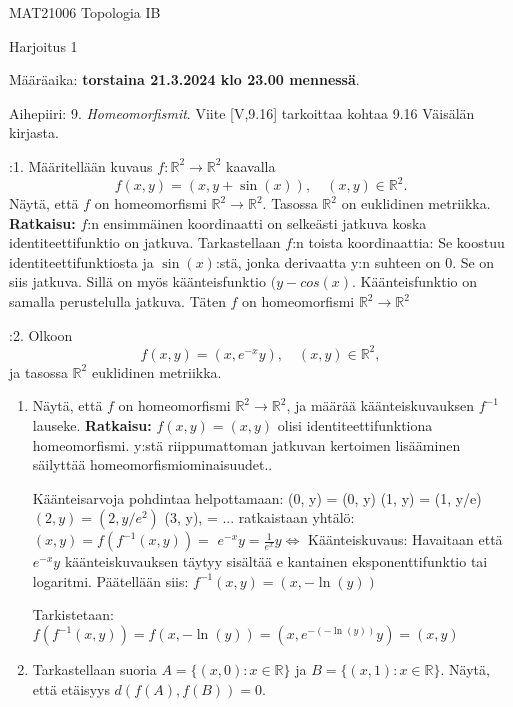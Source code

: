 \documentclass[12pt,a4paper,leqno]{amsart}
\begin{document}
\noindent MAT21006 Topologia IB

\noindent Harjoitus 1 

\noindent  Määräaika:  \textbf{torstaina 21.3.2024 klo 23.00 mennessä}.

\bigskip


Aihepiiri:  9. \textit{Homeomorfismit}.  Viite [V,9.16] tarkoittaa  kohtaa 9.16 Väisälän kirjasta.

\bigskip

:1. Määritellään kuvaus 
$f: \mathbb R^2 \to \mathbb R^2$ kaavalla
\[
f(x,y) = (x,y+\sin(x)), \quad (x,y) \in \mathbb R^2.
\]
Näytä, että $f$ on homeomorfismi  $\mathbb R^2 \to \mathbb R^2$. Tasossa $\mathbb R^2$ on euklidinen metriikka.
\\
\textbf{Ratkaisu:}
$f$:n ensimmäinen koordinaatti on selkeästi jatkuva koska identiteettifunktio on jatkuva. Tarkastellaan $f$:n toista koordinaattia: Se koostuu identiteettifunktiosta ja $\sin(x)$:stä, jonka derivaatta y:n suhteen on 0. Se on siis jatkuva. Sillä on myös käänteisfunktio $(y - cos(x)$. Käänteisfunktio on samalla perustelulla jatkuva. Täten $f$ on homeomorfismi $\mathbb R^2 \to \mathbb R^2$


:2.  Olkoon 
\[
f(x,y) = (x,e^{-x}y), \quad (x,y) \in \mathbb R^2,
\]
ja tasossa $ \mathbb R^2$ euklidinen metriikka. 

\begin{enumerate}
\item Näytä, että $f$ on homeomorfismi $\mathbb R^2 \to  \mathbb R^2$, ja määrää
käänteiskuvauksen $f^{-1}$ lauseke. 
\smallskip
\textbf{Ratkaisu: } 
$f(x, y) = (x, y)$ olisi identiteettifunktiona homeomorfismi. y:stä riippumattoman jatkuvan kertoimen lisääminen säilyttää homeomorfismiominaisuudet..

Käänteisarvoja pohdintaa helpottamaan: 
(0, y) = (0, y)
(1, y) = (1, y/e)
$(2, y) = (2, y/e^2)$
(3, y), = ...
ratkaistaan yhtälö: $(x, y) = f(f^{-1}(x, y)) = $
$e^{-x} y = \frac{1}{e^x} y \iff  $
Käänteiskuvaus: Havaitaan että $e^{-x}y$ käänteiskuvauksen täytyy sisältää e kantainen eksponenttifunktio tai logaritmi. Päätellään siis: $f^{-1}(x, y) = (x, -\ln(y))$

Tarkistetaan: $f(f^{-1}(x, y)) = f(x, -\ln (y) ) = (x, e^{-(-\ln(y))}y) = (x, y)$

\item Tarkastellaan suoria $A =\{(x,0): x \in \mathbb R\}$ 
ja $B =\{(x,1): x \in \mathbb R\}$.
Näytä, että etäisyys $d(f(A),f(B)) = 0$.   
\end{enumerate}
\end{document}
